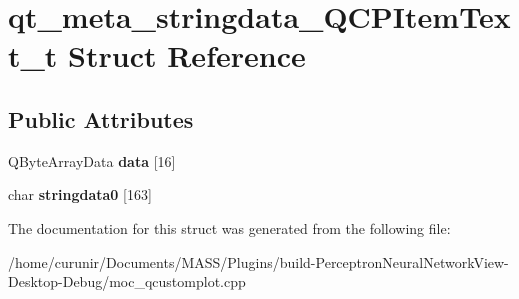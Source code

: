 \hypertarget{structqt__meta__stringdata___q_c_p_item_text__t}{}\section{qt\+\_\+meta\+\_\+stringdata\+\_\+\+Q\+C\+P\+Item\+Text\+\_\+t Struct Reference}
\label{structqt__meta__stringdata___q_c_p_item_text__t}
\subsection*{Public Attributes}
\begin{DoxyCompactItemize}
\item 
Q\+Byte\+Array\+Data {\bfseries data} \mbox{[}16\mbox{]}\hypertarget{structqt__meta__stringdata___q_c_p_item_text__t_a130c44d0975b8c3615445811c48edcab}{}\label{structqt__meta__stringdata___q_c_p_item_text__t_a130c44d0975b8c3615445811c48edcab}

\item 
char {\bfseries stringdata0} \mbox{[}163\mbox{]}\hypertarget{structqt__meta__stringdata___q_c_p_item_text__t_ab2e92c59ac0dced63f1fc1f4cc75cbc7}{}\label{structqt__meta__stringdata___q_c_p_item_text__t_ab2e92c59ac0dced63f1fc1f4cc75cbc7}

\end{DoxyCompactItemize}


The documentation for this struct was generated from the following file\+:\begin{DoxyCompactItemize}
\item 
/home/curunir/\+Documents/\+M\+A\+S\+S/\+Plugins/build-\/\+Perceptron\+Neural\+Network\+View-\/\+Desktop-\/\+Debug/moc\+\_\+qcustomplot.\+cpp\end{DoxyCompactItemize}
